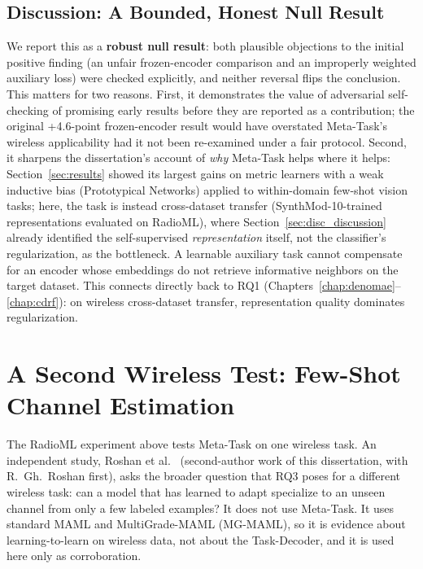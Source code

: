 \subsection{Discussion: A Bounded, Honest Null Result}

We report this as a \textbf{robust null result}: both plausible objections to the initial positive finding (an unfair frozen-encoder comparison and an improperly weighted auxiliary loss) were checked explicitly, and neither reversal flips the conclusion. This matters for two reasons. First, it demonstrates the value of adversarial self-checking of promising early results before they are reported as a contribution; the original +4.6-point frozen-encoder result would have overstated Meta-Task's wireless applicability had it not been re-examined under a fair protocol. Second, it sharpens the dissertation's account of \emph{why} Meta-Task helps where it helps: Section~\ref{sec:results} showed its largest gains on metric learners with a weak inductive bias (Prototypical Networks) applied to within-domain few-shot vision tasks; here, the task is instead cross-dataset transfer (SynthMod-10-trained representations evaluated on RadioML), where Section~\ref{sec:disc_discussion} already identified the self-supervised \emph{representation} itself, not the classifier's regularization, as the bottleneck. A learnable auxiliary task cannot compensate for an encoder whose embeddings do not retrieve informative neighbors on the target dataset. This connects directly back to RQ1 (Chapters~\ref{chap:denomae}--\ref{chap:cdrf}): on wireless cross-dataset transfer, representation quality dominates regularization.

\section{A Second Wireless Test: Few-Shot Channel Estimation}
\label{sec:channel_estimation}

The RadioML experiment above tests Meta-Task on one wireless task. An independent study, Roshan et al.~\cite{roshan2026channelestimation} (second-author work of this dissertation, with R.~Gh.~Roshan first), asks the broader question that RQ3 poses for a different wireless task: can a model that has learned to adapt specialize to an unseen channel from only a few labeled examples? It does not use Meta-Task. It uses standard MAML and MultiGrade-MAML (MG-MAML), so it is evidence about learning-to-learn on wireless data, not about the Task-Decoder, and it is used here only as corroboration.

